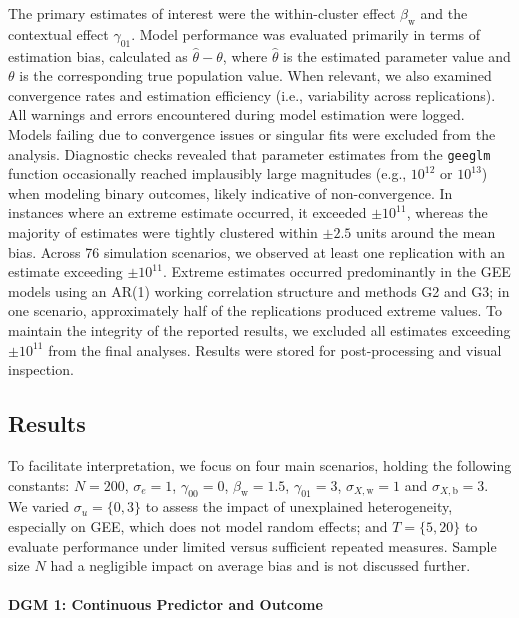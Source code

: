 The primary estimates of interest were the within-cluster effect \( \beta_{\text{w}} \) and the contextual effect \( \gamma_{01} \). Model performance was evaluated primarily in terms of estimation bias, calculated as \( \hat{\theta} - \theta \), where \( \hat{\theta} \) is the estimated parameter value and \( \theta \) is the corresponding true population value. When relevant, we also examined convergence rates and estimation efficiency (i.e., variability across replications). All warnings and errors encountered during model estimation were logged. Models failing due to convergence issues or singular fits were excluded from the analysis. Diagnostic checks revealed that parameter estimates from the \texttt{geeglm} function \parencite{halekoh_r_2006} occasionally reached implausibly large magnitudes (e.g., $10^{12}$ or $10^{13}$) when modeling binary outcomes, likely indicative of non-convergence. In instances where an extreme estimate occurred, it exceeded $\pm 10^{11}$, whereas the majority of estimates were tightly clustered within $\pm 2.5$ units around the mean bias. Across 76 simulation scenarios, we observed at least one replication with an estimate exceeding $\pm 10^{11}$. Extreme estimates occurred predominantly in the GEE models using an AR(1) working correlation structure and methods G2 and G3; in one scenario, approximately half of the replications produced extreme values. To maintain the integrity of the reported results, we excluded all estimates exceeding $\pm 10^{11}$ from the final analyses. Results were stored for post-processing and visual inspection.

\subsection{Results}

To facilitate interpretation, we focus on four main scenarios, holding the following constants: \( N = 200 \), \( \sigma_e = 1 \), \( \gamma_{00} = 0 \), \( \beta_{\text{w}} = 1.5 \), \( \gamma_{01} = 3 \),  \(\sigma_{X,\text{w}} = 1\) and \(\sigma_{X,\text{b}} = 3\). We varied \(\sigma_u = \{0, 3\}\) to assess the impact of unexplained heterogeneity, especially on GEE, which does not model random effects; and \( T = \{5, 20\} \) to evaluate performance under limited versus sufficient repeated measures. Sample size \(N\) had a negligible impact on average bias and is not discussed further.

\paragraph{DGM 1: Continuous Predictor and Outcome}

